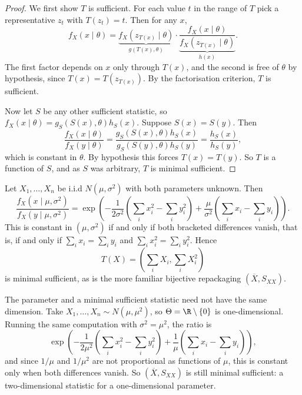 \begin{proof}
  We first show $T$ is sufficient. For each value $t$ in the range of $T$ pick a representative $z_t$ with $T(z_t) = t$. Then for any $x$,
  $$
  f_X(x \mid \theta) = \underbrace{f_X\left(z_{T(x)} \mid \theta\right)}_{g(T(x), \theta)}\cdot \underbrace{\frac{f_X(x\mid\theta)}{f_X\left(z_{T(x)}\mid\theta\right)}}_{h(x)}.
  $$
  The first factor depends on $x$ only through $T(x)$, and the second is free of $\theta$ by hypothesis, since $T(x) = T(z_{T(x)})$. By the factorisation criterion, $T$ is sufficient.

  Now let $S$ be any other sufficient statistic, so $f_X(x\mid\theta) = g_S(S(x),\theta)h_S(x)$. Suppose $S(x) = S(y)$. Then
  $$
  \frac{f_X(x\mid\theta)}{f_X(y\mid\theta)} = \frac{g_S(S(x),\theta)h_S(x)}{g_S(S(y),\theta)h_S(y)} = \frac{h_S(x)}{h_S(y)},
  $$
  which is constant in $\theta$. By hypothesis this forces $T(x) = T(y)$. So $T$ is a function of $S$, and as $S$ was arbitrary, $T$ is minimal sufficient.
\end{proof}

\begin{example}
  Let $X_1, \dots, X_n$ be i.i.d $N(\mu,\sigma^2)$ with both parameters unknown. Then
  $$
  \frac{f_X(x\mid\mu,\sigma^2)}{f_X(y\mid\mu,\sigma^2)} = \exp\left(-\frac{1}{2\sigma^2}\left(\sum_i x_i^2 - \sum_i y_i^2\right) + \frac{\mu}{\sigma^2}\left(\sum_i x_i - \sum_i y_i\right)\right).
  $$
  This is constant in $(\mu, \sigma^2)$ if and only if both bracketed differences vanish, that is, if and only if $\sum_i x_i = \sum_i y_i$ and $\sum_i x_i^2 = \sum_i y_i^2$. Hence
  $$
  T(X) = \left(\sum_i X_i, \sum_i X_i^2\right)
  $$
  is minimal sufficient, as is the more familiar bijective repackaging $(\overline{X}, S_{XX})$.
\end{example}

\begin{example}
  The parameter and a minimal sufficient statistic need not have the same dimension. Take $X_1, \dots, X_n \sim N(\mu, \mu^2)$, so $\Theta = \R\setminus\{0\}$ is one-dimensional. Running the same computation with $\sigma^2 = \mu^2$, the ratio is
  $$
  \exp\left(-\frac{1}{2\mu^2}\left(\sum_i x_i^2 - \sum_i y_i^2\right) + \frac{1}{\mu}\left(\sum_i x_i - \sum_i y_i\right)\right),
  $$
  and since $1/\mu$ and $1/\mu^2$ are not proportional as functions of $\mu$, this is constant only when both differences vanish. So $(\overline{X}, S_{XX})$ is still minimal sufficient: a two-dimensional statistic for a one-dimensional parameter.
\end{example}

